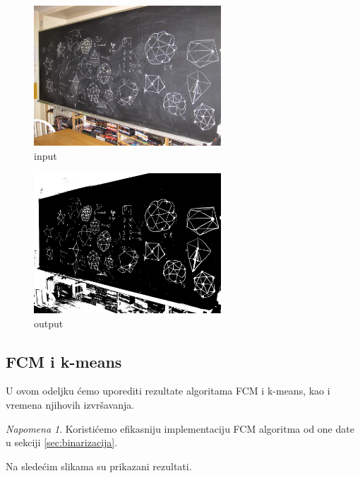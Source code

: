 \documentclass[12pt,a4paper]{article}
\theoremstyle{definition}
\theoremstyle{remark}
\newtheorem{no}{Napomena}[section]
\theoremstyle{plain}
\begin{document}
\begin{multicols}{2}
\begin{figure}[H]
\centering
\includegraphics[width=7cm]{images/blackboard.jpg}
  \caption{input}\label{blackboard_input}
\end{figure}
\columnbreak
\begin{figure}[H]
\centering
\includegraphics[width=7cm]{images/blackboard_binarized_fcm.png}
  \caption{output}
\end{figure}
\end{multicols}

\subsection{FCM i k-means}
U ovom odeljku \' cemo uporediti rezultate algoritama FCM i k-means, kao i vremena njihovih izvr\v savanja.

\begin{no}
  Koristi\' cemo efikasniju implementaciju FCM algoritma od one date u sekciji \ref{sec:binarizacija}.
\end{no}

Na slede\' cim slikama su prikazani rezultati.
\end{document}
